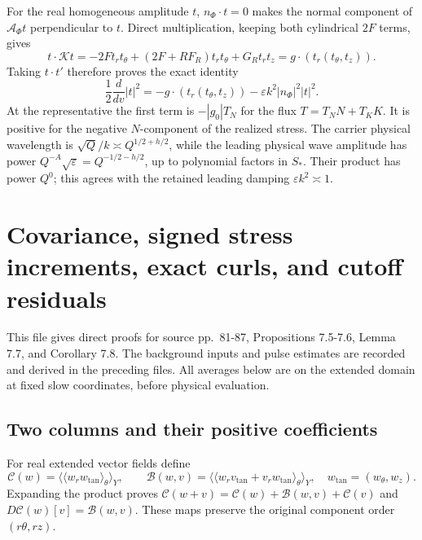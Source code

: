 \documentclass[10pt,a4paper]{article}
\begin{document}
For the real homogeneous amplitude \(t\), \(n_\Phi\cdot t=0\) makes the normal component of \(\mathcal A_\Phi t\) perpendicular to \(t\). Direct multiplication, keeping both cylindrical \(2F\) terms, gives \[
t\cdot\mathcal Kt
=-2Ft_rt_\theta+(2F+RF_R)t_rt_\theta+G_Rt_rt_z
=g\cdot(t_r(t_\theta,t_z)).
\] Taking \(t\cdot t'\) therefore proves the exact identity \[
\frac12\frac{d}{dv}|t|^2
=-g\cdot(t_r(t_\theta,t_z))-\varepsilon k^2|n_\Phi|^2|t|^2.
\] At the representative the first term is \(-|g_0|T_N\) for the flux \(T=T_NN+T_KK\). It is positive for the negative \(N\)-component of the realized stress. The carrier physical wavelength is \(\sqrt Q/k\asymp Q^{1/2+h/2}\), while the leading physical wave amplitude has power \(Q^{-A}\sqrt\varepsilon=Q^{-1/2-h/2}\), up to polynomial factors in \(S_*\). Their product has power \(Q^0\); this agrees with the retained leading damping \(\varepsilon k^2\asymp1\).

\section{Covariance, signed stress increments, exact curls, and cutoff residuals}\label{covariance-signed-stress-increments-exact-curls-and-cutoff-residuals}

This file gives direct proofs for source pp.~81-87, Propositions 7.5-7.6, Lemma 7.7, and Corollary 7.8. The background inputs and pulse estimates are recorded and derived in the preceding files. All averages below are on the extended domain at fixed slow coordinates, before physical evaluation.

\subsection{Two columns and their positive coefficients}\label{two-columns-and-their-positive-coefficients}

For real extended vector fields define \[
\mathcal C(w)=\langle\langle w_rw_{\tan}\rangle_\theta\rangle_Y,\qquad
\mathcal B(w,v)=
\langle\langle w_rv_{\tan}+v_rw_{\tan}\rangle_\theta\rangle_Y,
\quad w_{\tan}=(w_\theta,w_z).
\] Expanding the product proves \(\mathcal C(w+v)=\mathcal C(w)+\mathcal B(w,v)+\mathcal C(v)\) and \(D\mathcal C(w)[v]=\mathcal B(w,v)\). These maps preserve the original component order \((r\theta,rz)\).
\end{document}
